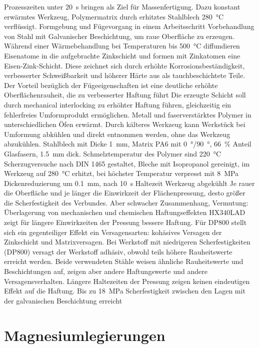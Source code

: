 \cite{BerndArno2019}
Prozesszeiten unter \SI{20}{\second} bringen als Ziel für Massenfertigung.
Dazu konstant erwärmtes Werkzeug, Polymermatrix durch erhitztes Stahlblech \SI{280}{\degreeCelsius} verflüssigt.
Formgebung und Fügevorgang in einem Arbeitsschritt
Vorbehandlung von Stahl mit Galvanischer Beschichtung, um raue Oberfläche zu erzeugen.
Während einer Wärmebehandlung bei Temperaturen bis \SI{500}{\degreeCelsius} diffundieren Eisenatome in die aufgebrachte Zinkschicht und formen mit Zinkatomen eine Eisen-Zink-Schicht.
Diese zeichnet sich durch erhöhte Korrosionsbeständigkeit, verbesserter Schweißbarkeit und höherer Härte aus als tauchbeschichtete Teile.
Der Vorteil bezüglich der Fügeeigenschaften ist eine deutliche erhöhte Oberflächenrauheit, die zu verbesserter Haftung führt %
Die erzeugte Schicht soll durch mechanical interlocking zu erhöhter Haftung führen, gleichzeitig ein fehlerfreies Umformprodukt ermöglichen.
Metall und faserverstärktes Polymer in unterschiedlichen Öfen erwärmt.
Durch kälteres Werkzeug kann Werkstück bei Umformung abkühlen und direkt entnommen werden, ohne das Werkzeug abzukühlen.
Stahlblech mit Dicke \SI{1}{\mm}, Matrix PA6 mit \SI{0}{\degree}/\SI{90}{\degree}, \SI{66}{\percent} Anteil Glasfasern, \SI{1,5}{\mm} dick.
Schmelztemperatur des Polymer sind \SI{220}{\degreeCelsius}
Scherzugversuche nach DIN 1465 gestaltet, Bleche mit Isopropanol gereinigt, im Werkzeug auf \SI{280}{\degreeCelsius} erhitzt, bei höchster Temperatur verpresst mit \SI{8}{\MPa}
Dickenreduzierung um \SI{0,1}{\mm}, nach \SI{10}{\second} Haltezeit Werkzeug abgekühlt
Je rauer die Oberfläche und je länger die Einwirkzeit der Flächenpressung, desto größer die Scherfestigkeit des Verbundes.
Aber schwacher Zusammenhang, Vermutung: Überlagerung von mechanischen und chemischen Haftungseffekten
HX340LAD zeigt für längere Einwirkzeiten der Pressung bessere Haftung.
Für DP800 stellt sich ein gegenteiliger Effekt ein
Versagensarten: kohäsives Versagen der Zinkschicht und Matrixversagen.
Bei Werkstoff mit niedrigeren Scherfestigkeiten (DP800) versagt der Werkstoff adhäsiv, obwohl teils höhere Rauheitswerte erreicht werden.
Beide verwendeten Stähle weisen ähnliche Rauheitswerte und Beschichtungen auf, zeigen aber andere Haftungswerte und andere Versagensverhalten.
Längere Haltezeiten der Pressung zeigen keinen eindeutigen Effekt auf die Haftung.
Bis zu \SI{18}{\MPa} Scherfestigkeit zwischen den Lagen mit der galvanischen Beschichtung erreicht


\section{Magnesiumlegierungen}\label{sec:Mg}

